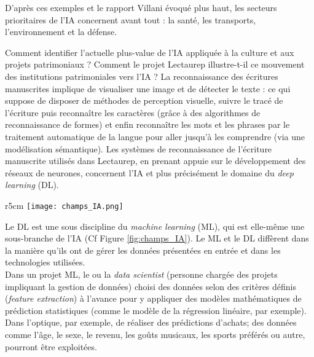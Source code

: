 D'après ces exemples et le rapport Villani évoqué plus haut, les secteurs prioritaires de l'IA concernent avant tout : la santé, les transports, l'environnement et la défense. 

Comment identifier l'actuelle plus-value de l'IA appliquée à la culture et aux projets patrimoniaux ? Comment le projet Lectaurep illustre-t-il ce mouvement des institutions patrimoniales vers l'IA ? 
La reconnaissance des écritures manuscrites implique de visualiser une image et de détecter le texte : ce qui suppose de disposer de méthodes de perception visuelle, suivre le tracé de l'écriture puis reconnaître les caractères (grâce à des algorithmes de reconnaissance de formes) et enfin reconnaître les mots et les phrases par le traitement automatique de la langue pour aller jusqu'à les comprendre (via une modélisation sémantique). Les systèmes de reconnaissance de l'écriture manuscrite utilisés dans Lectaurep, en prenant appuie sur le développement des réseaux de neurones, concernent l'IA et plus précisément le domaine du \textit{deep learning} (DL).\\

\begin{wrapfigure}[13]{r}{5cm}
    \centering
    \texttt{[image: champs\_IA.png]}
    \caption{Les différentes disciplines de l'IA \textcopyright L. Terriel, 2020, Diagrams.net}
    \label{fig:champs_IA}
\end{wrapfigure}
Le DL est une sous discipline du \textit{machine learning} (ML), qui est elle-même une sous-branche de l'IA (Cf Figure \ref{fig:champs_IA}). Le ML et le DL diffèrent dans la manière qu'ils ont de gérer les données présentées en entrée et dans les technologies utilisées.\\

Dans un projet ML, le ou la \textit{data scientist} (personne chargée des projets impliquant la gestion de données) choisi des données selon des critères définis (\textit{feature extraction}) à l'avance pour y appliquer des modèles mathématiques de prédiction statistiques (comme le modèle de la régression linéaire, par exemple). Dans l'optique, par exemple, de réaliser des prédictions d'achats; des données comme l'âge, le sexe, le revenu, les goûts musicaux, les sports préférés ou autre, pourront être exploitées.\\

